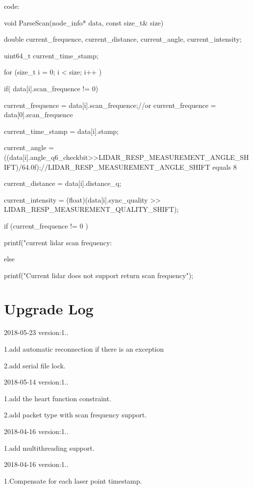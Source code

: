 code\+: \begin{DoxyVerb}    void ParseScan(node_info* data, const size_t& size) {

        double current_frequence, current_distance, current_angle, current_intensity;

        uint64_t current_time_stamp;

        for (size_t i = 0; i < size; i++ ) {

            if( data[i].scan_frequence != 0) {

                current_frequence =  data[i].scan_frequence;//or current_frequence = data[0].scan_frequence

            }

            current_time_stamp = data[i].stamp;

            current_angle = ((data[i].angle_q6_checkbit>>LIDAR_RESP_MEASUREMENT_ANGLE_SHIFT)/64.0f);//LIDAR_RESP_MEASUREMENT_ANGLE_SHIFT equals 8

            current_distance =  data[i].distance_q;

            current_intensity = (float)(data[i].sync_quality >> LIDAR_RESP_MEASUREMENT_QUALITY_SHIFT);

        }

        if (current_frequence != 0 ) {

            printf("current lidar scan frequency: %

        } else {

            printf("Current lidar does not support return scan frequency\n");

        }
    }
\end{DoxyVerb}


\section*{Upgrade Log }

2018-\/05-\/23 version\+:1..

1.\+add automatic reconnection if there is an exception

2.\+add serial file lock.

2018-\/05-\/14 version\+:1..

1.\+add the heart function constraint.

2.\+add packet type with scan frequency support.

2018-\/04-\/16 version\+:1..

1.\+add multithreading support.

2018-\/04-\/16 version\+:1..

1.\+Compensate for each laser point timestamp. 